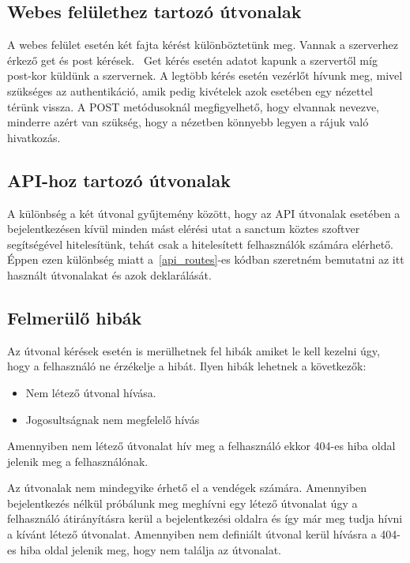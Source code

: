 \documentclass[
]{thesis-ekf}
\theoremstyle{definition}
\theoremstyle{remark}
\begin{document}
	\subsection{Webes felülethez tartozó útvonalak}
	A webes felület esetén két fajta kérést különböztetünk meg. Vannak a szerverhez érkező get és post kérések.~\cite{get_post_difference} Get kérés esetén adatot kapunk a szervertől míg post-kor küldünk a szervernek. A legtöbb kérés esetén vezérlőt hívunk meg, mivel szükséges az authentikáció, amik pedig kivételek azok esetében egy nézettel térünk vissza. A POST metódusoknál megfigyelhető, hogy elvannak nevezve, minderre azért van szükség, hogy a nézetben könnyebb legyen a rájuk való hivatkozás. 
	
	\subsection{API-hoz tartozó útvonalak}
	A különbség a két útvonal gyűjtemény között, hogy az API útvonalak esetében a bejelentkezésen kívül minden mást elérési utat a sanctum köztes szoftver segítségével hitelesítünk, tehát csak a hitelesített felhasználók számára elérhető. Éppen ezen különbség miatt a~\ref{api_routes}-es kódban szeretném bemutatni az itt használt útvonalakat és azok deklarálását.
	
	
	
	\subsection{Felmerülő hibák}
	Az útvonal kérések esetén is merülhetnek fel hibák amiket le kell kezelni úgy, hogy a felhasználó ne érzékelje a hibát. Ilyen hibák lehetnek a következők:
	\begin{itemize}
		\item Nem létező útvonal hívása.
		\item Jogosultságnak nem megfelelő hívás
	\end{itemize}
	
	Amennyiben nem létező útvonalat hív meg a felhasználó ekkor 404-es hiba oldal jelenik meg a felhasználónak. 
	
	Az útvonalak nem mindegyike érhető el a vendégek számára. Amennyiben bejelentkezés nélkül próbálunk meg meghívni egy létező útvonalat úgy a felhasználó átirányításra kerül a bejelentkezési oldalra és így már meg tudja hívni a kívánt létező útvonalat. Amennyiben nem definiált útvonal kerül hívásra a 404-es hiba oldal jelenik meg, hogy nem találja az útvonalat.
	
\end{document}
